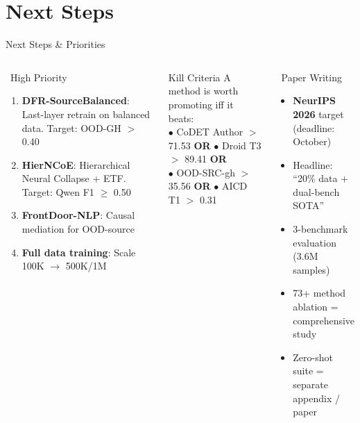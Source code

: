 \documentclass[aspectratio=169, 10pt]{beamer}
\begin{document}
\section{Next Steps}

\begin{frame}{Next Steps \& Priorities}
\vspace{-0.25cm}
\begin{columns}[T]
\begin{block}{\faRocket\ High Priority}
\scriptsize
\begin{enumerate}\setlength\itemsep{2pt}
    \item \textbf{DFR-SourceBalanced}: Last-layer retrain on balanced data. Target: OOD-GH $>$ 0.40
    \item \textbf{HierNCoE}: Hierarchical Neural Collapse + ETF. Target: Qwen F1 $\geq$ 0.50
    \item \textbf{FrontDoor-NLP}: Causal mediation for OOD-source
    \item \textbf{Full data training}: Scale 100K $\to$ 500K/1M
\end{enumerate}
\end{block}

\vspace{-0.1cm}
\begin{exampleblock}{\scriptsize Kill Criteria}
\tiny
A method is worth promoting iff it beats:\\
$\bullet$ CoDET Author $>$ 71.53 \textbf{OR}
$\bullet$ Droid T3 $>$ 89.41 \textbf{OR}\\
$\bullet$ OOD-SRC-gh $>$ 35.56 \textbf{OR}
$\bullet$ AICD T1 $>$ 0.31
\end{exampleblock}

\begin{block}{\faPen\ Paper Writing}
\scriptsize
\begin{itemize}\setlength\itemsep{2pt}
    \item \textbf{NeurIPS 2026} target (deadline: October)
    \item Headline: ``20\% data + dual-bench SOTA''
    \item 3-benchmark evaluation (3.6M samples)
    \item 73+ method ablation = comprehensive study
    \item Zero-shot suite = separate appendix / paper
\end{itemize}
\end{block}


\end{columns}
\end{frame}
\end{document}
